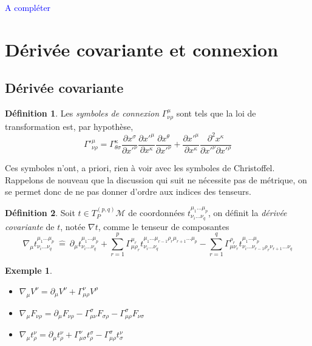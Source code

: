 \documentclass[a4paper,11pt]{report}
\theoremstyle{definition}
\theoremstyle{plain}
\theoremstyle{definition}
\newtheorem{defn}{Définition}[chapter]
\newtheorem{exmp}{Exemple}[chapter]
\theoremstyle{remark}
\newcommand{\comp}{\begin{center}\textcolor{blue}{A compléter}\end{center}}
\newcommand{\M}{\mathscr{M}}
\newcommand{\p}{\partial}
\begin{document}
            \comp
        
        \section{Dérivée covariante et connexion}
        
            \subsection{Dérivée covariante}
        
                \begin{defn}
                    Les \textit{symboles de connexion} $\Gamma^\mu_{\nu\rho}$ sont tels que la loi de transformation est, par hypothèse,
                    \begin{equation}
                        \Gamma'^\mu_{\nu\rho} = \Gamma^\kappa_{\theta\sigma}\frac{\p x^\sigma}{\p x'^\nu} \frac{\p x'^\mu}{\p x^\kappa}\frac{\p x^\theta}{\p x'^\nu} +  \frac{\p x'^\mu}{\p x^\kappa}\frac{\p^2 x^\kappa}{\p x'^\nu\p x'^\rho}
                    \end{equation}
                \end{defn}
                
                Ces symboles n'ont, a priori, rien à voir avec les symboles de Christoffel. Rappelons de nouveau que la discussion qui suit ne nécessite pas de métrique, on se permet donc de ne pas donner d'ordre aux indices des tenseurs.
                
                \begin{defn}
                    Soit $t\in T_P^{(p,q)}\M$ de coordonnées $t^{\mu_1\dots\mu_p}_{\nu_i\dots\nu_q}$, on définit la \textit{dérivée covariante} de $t$, notée $\nabla t$, comme le tenseur de composantes
                    \begin{equation}
                        \nabla_\mu t^{\mu_1\dots\mu_p}_{\nu_i\dots\nu_q} ~\hat{=}~ \p_\mu t^{\mu_1\dots\mu_p}_{\nu_i\dots\nu_q}+\sum_{r=1}^p \Gamma^{\mu_r}_{\mu\rho_r}t^{\mu_1\dots\mu_{r-1}\rho_r\mu_{r+1}\dots\mu_p}_{\nu_i\dots\nu_q} - \sum_{r=1}^q \Gamma^{\rho_r}_{\mu\nu_r}t^{\mu_1\dots\mu_p}_{\nu_i\dots\nu_{r-1}\rho_r\nu_{r+1}\dots\nu_q}
                    \end{equation}
                \end{defn}
                
                \begin{exmp}${}$
                    \begin{itemize}[label = \textbullet]
                        \item $\nabla_\mu V^\nu = \p_\mu V^\nu + \Gamma^\nu_{\mu\rho} V^\rho$
                        \item $\nabla_\mu F_{\nu\rho} = \p_\mu F_{\nu\rho}-\Gamma^\sigma_{\mu\nu}F_{\sigma\rho}-\Gamma^{\sigma}_{\mu\rho}F_{\nu\sigma}$
                        \item $\nabla_\mu t^\nu_\rho = \p_\mu t^\nu_\rho+\Gamma^\nu_{\mu\sigma}t^\sigma_\rho - \Gamma^\sigma_{\mu\rho}t^\nu_\sigma$
                    \end{itemize}
                \end{exmp}
                
\end{document}
